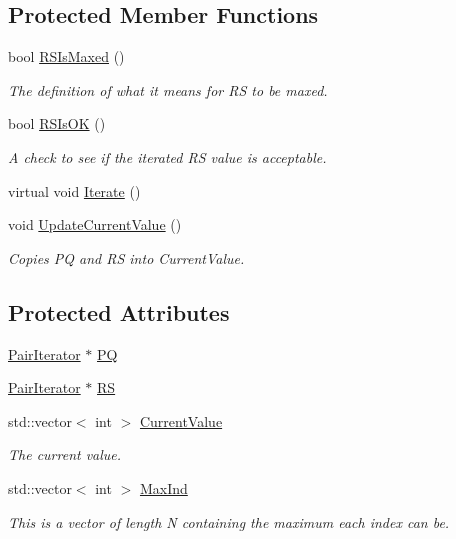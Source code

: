 \subsection*{Protected Member Functions}
\begin{DoxyCompactItemize}
\item 
bool \hyperlink{classJKBuilder_1_1ShellQuartetIterator_a458dcf49c4c4bbb1e3d3d39d3dc086c9}{RSIsMaxed} ()
\begin{DoxyCompactList}\small\item\em The definition of what it means for RS to be maxed. \item\end{DoxyCompactList}\item 
bool \hyperlink{classJKBuilder_1_1ShellQuartetIterator_a13e657ea529c0566a0bf48e9c5a488d7}{RSIsOK} ()
\begin{DoxyCompactList}\small\item\em A check to see if the iterated RS value is acceptable. \item\end{DoxyCompactList}\item 
virtual void \hyperlink{classJKBuilder_1_1QuartetIterator_a7874a07e98b52f4f147cde6f39353bae}{Iterate} ()
\item 
void \hyperlink{classJKBuilder_1_1QuartetIterator_a1af5c865d6e9cfe63d0dedc53bdc13ba}{UpdateCurrentValue} ()
\begin{DoxyCompactList}\small\item\em Copies PQ and RS into CurrentValue. \item\end{DoxyCompactList}\end{DoxyCompactItemize}
\subsection*{Protected Attributes}
\begin{DoxyCompactItemize}
\item 
\hyperlink{classJKBuilder_1_1PairIterator}{PairIterator} $\ast$ \hyperlink{classJKBuilder_1_1QuartetIterator_a84f5c3632fba19d3bb85e1cffb9e51f7}{PQ}
\item 
\hyperlink{classJKBuilder_1_1PairIterator}{PairIterator} $\ast$ \hyperlink{classJKBuilder_1_1QuartetIterator_a26b777bf7ea22524f1cc725020ee2082}{RS}
\item 
std::vector$<$ int $>$ \hyperlink{classJKBuilder_1_1Iterator_a20ca24f6d827aba144bb087c4bcb74a0}{CurrentValue}
\begin{DoxyCompactList}\small\item\em The current value. \item\end{DoxyCompactList}\item 
std::vector$<$ int $>$ \hyperlink{classJKBuilder_1_1Iterator_ab6b56d3c4e9353bc938dd6249cde9ca0}{MaxInd}
\begin{DoxyCompactList}\small\item\em This is a vector of length N containing the maximum each index can be. \item\end{DoxyCompactList}\end{DoxyCompactItemize}


